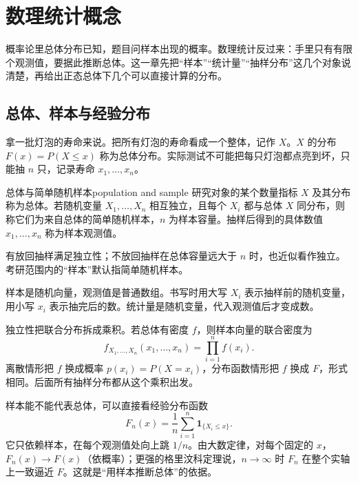 \section{数理统计概念}

概率论里总体分布已知，题目问样本出现的概率。数理统计反过来：手里只有有限个观测值，要据此推断总体。这一章先把“样本”“统计量”“抽样分布”这几个对象说清楚，再给出正态总体下几个可以直接计算的分布。

\subsection{总体、样本与经验分布}

拿一批灯泡的寿命来说。把所有灯泡的寿命看成一个整体，记作 $X$。$X$ 的分布 $F(x)=P(X\le x)$ 称为总体分布。实际测试不可能把每只灯泡都点亮到坏，只能抽 $n$ 只，记录寿命 $x_1,\dots,x_n$。

\begin{mydef}{总体与简单随机样本}{population and sample}
    研究对象的某个数量指标 $X$ 及其分布称为总体。若随机变量 $X_1,\dots,X_n$ 相互独立，且每个 $X_i$ 都与总体 $X$ 同分布，则称它们为来自总体的简单随机样本，$n$ 为样本容量。抽样后得到的具体数值 $x_1,\dots,x_n$ 称为样本观测值。
\end{mydef}

有放回抽样满足独立性；不放回抽样在总体容量远大于 $n$ 时，也近似看作独立。考研范围内的“样本”默认指简单随机样本。

样本是随机向量，观测值是普通数组。书写时用大写 $X_i$ 表示抽样前的随机变量，用小写 $x_i$ 表示抽完后的数。统计量是随机变量，代入观测值后才变成数。

独立性把联合分布拆成乘积。若总体有密度 $f$，则样本向量的联合密度为
\[
    f_{X_1,\dots,X_n}(x_1,\dots,x_n)=\prod_{i=1}^{n}f(x_i).
\]
离散情形把 $f$ 换成概率 $p(x_i)=P(X=x_i)$，分布函数情形把 $f$ 换成 $F$，形式相同。后面所有抽样分布都从这个乘积出发。

样本能不能代表总体，可以直接看经验分布函数
\[
    F_n(x)=\frac{1}{n}\sum_{i=1}^{n}\mathbf{1}_{\{X_i\le x\}}.
\]
它只依赖样本，在每个观测值处向上跳 $1/n$。由大数定律，对每个固定的 $x$，$F_n(x)\to F(x)$（依概率）；更强的格里汶科定理说，$n\to\infty$ 时 $F_n$ 在整个实轴上一致逼近 $F$。这就是“用样本推断总体”的依据。

